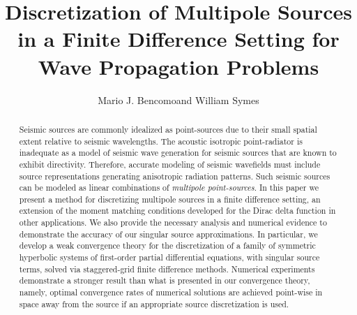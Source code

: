 
\title{Discretization of Multipole Sources in a Finite Difference Setting for Wave Propagation Problems}
\date{}
\address{
        \footnotemark[1]Institute for Computational and Experimental Research in Mathematics,\\ Brown University,\\ Providence, RI 02912 USA\\
        \footnotemark[2]The Rice Inversion Project,\\ Rice University,\\ Houston, TX
        77005-1892 USA
}
\author{Mario J. Bencomo\footnotemark[1] and William Symes\footnotemark[2]}


\maketitle
\parskip 12pt


\begin{abstract}

Seismic sources are commonly idealized as point-sources due
to their small spatial extent relative to seismic wavelengths.
The acoustic isotropic point-radiator is inadequate as a model 
of seismic wave generation for seismic sources that are known to exhibit directivity. 
Therefore, accurate modeling of seismic wavefields must include source 
representations generating anisotropic radiation patterns. 
Such seismic sources can be modeled as linear combinations of 
{\em multipole point-sources}.
In this paper we present a method for discretizing multipole sources 
in a finite difference setting, an extension of the moment matching 
conditions developed for the Dirac delta function in other applications.
We also provide the necessary analysis and numerical evidence 
to demonstrate the accuracy of our singular source approximations.
In particular, we develop a weak convergence theory for the discretization of 
a family of symmetric hyperbolic systems of first-order partial differential equations, with singular source terms, solved via staggered-grid finite difference methods.
Numerical experiments demonstrate a stronger result than 
what is presented in our convergence theory, namely, optimal convergence rates 
of numerical solutions are achieved point-wise in space away from the source if an 
appropriate source discretization is used.

\end{abstract}


